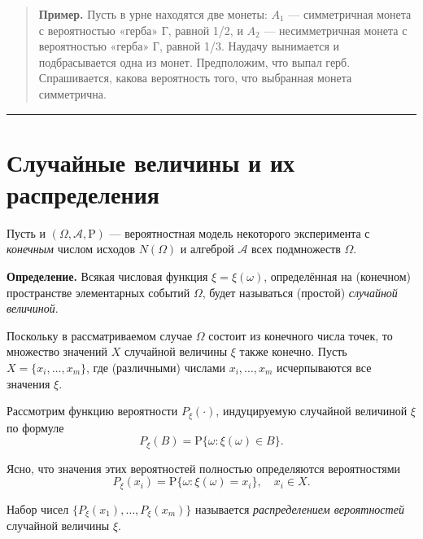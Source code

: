 \documentclass[11pt,a4paper]{article}
\renewcommand{\linethickness}{0.1ex}
\begin{document}
\begin{quote}
\textbf{Пример.} Пусть в урне находятся две монеты: \(A_1\) ---
симметричная монета с вероятностью «герба» Г, равной 1/2, и \(A_2\) ---
несимметричная монета с вероятностью «герба» Г, равной 1/3. Наудачу
вынимается и подбрасывается одна из монет. Предположим, что выпал герб.
Спрашивается, какова вероятность того, что выбранная монета симметрична.
\end{quote}

    \begin{center}\rule{0.5\linewidth}{\linethickness}\end{center}

    \hypertarget{ux441ux43bux443ux447ux430ux439ux43dux44bux435-ux432ux435ux43bux438ux447ux438ux43dux44b-ux438-ux438ux445-ux440ux430ux441ux43fux440ux435ux434ux435ux43bux435ux43dux438ux44f}{%
\section{Случайные величины и их
распределения}\label{ux441ux43bux443ux447ux430ux439ux43dux44bux435-ux432ux435ux43bux438ux447ux438ux43dux44b-ux438-ux438ux445-ux440ux430ux441ux43fux440ux435ux434ux435ux43bux435ux43dux438ux44f}}

Пусть и \((\Omega, \mathcal{A}, \mathrm{P})\) --- вероятностная модель
некоторого эксперимента с \emph{конечным} числом исходов \(N(\Omega)\) и
алгеброй \(\mathcal{A}\) всех подмножеств \(\Omega\).

\textbf{Определение.} Всякая числовая функция \(\xi = \xi(\omega)\),
определённая на (конечном) пространстве элементарных событий \(\Omega\),
будет называться (простой) \emph{случайной величиной}.

Поскольку в рассматриваемом случае \(\Omega\) состоит из конечного числа
точек, то множество значений \(X\) случайной величины \(\xi\) также
конечно. Пусть \(X = \{x_i, \ldots, x_m\}\), где (различными) числами
\(x_i, \ldots, x_m\) исчерпываются все значения \(\xi\).

Рассмотрим функцию вероятности \(P_\xi(\cdot)\), индуцируемую случайной
величиной \(\xi\) по формуле
\[ P_\xi(B) = \mathrm{P}\{\omega: \xi(\omega) \in B\}. \]

Ясно, что значения этих вероятностей полностью определяются
вероятностями
\[ P_\xi(x_i) = \mathrm{P}\{\omega: \xi(\omega) = x_i\}, \quad x_i \in X. \]

Набор чисел \(\{ P_\xi(x_1), \ldots , P_\xi(x_m) \}\) называется
\emph{распределением вероятностей} случайной величины \(\xi\).
\end{document}
